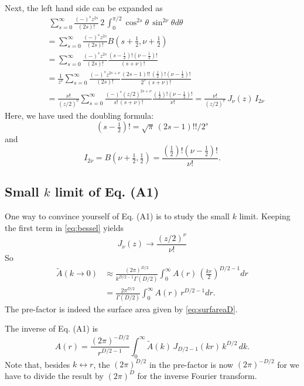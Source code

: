 \documentclass[preprint]{revtex4-1}
\numberwithin{equation}{subsection}
\numberwithin{table}{section}
\begin{document}
Next, the left hand side can be expanded as
%
\begin{align*}
& \;
  \sum_{s = 0}^\infty
  \frac{ (-)^s z^{2s} } { (2s)! }
  \,
  2 \, \int_0^{\pi/2} \cos^{2s} \theta \, \sin^{2\nu} \theta d \theta
  \\
&=
  \sum_{s = 0}^\infty
  \frac{ (-)^s z^{2s} } { (2s)! }
  B(s+\tfrac 1 2, \nu + \tfrac 1 2)
  \\
&=
  \sum_{s = 0}^\infty
  \frac{ (-)^s z^{2s} } { (2s)! }
  \frac{ (s-\tfrac 1 2)! (\nu - \tfrac 1 2)! }
       {  (s + \nu)!    }
  \\
&=
  \frac{1}{z^\nu}
  \sum_{s = 0}^\infty
  \frac{ (-)^s z^{2s + \nu} } { (2s)! }
  \frac{ (2s-1)!! \, (\tfrac 1 2)! (\nu - \tfrac 1 2)! }
      { 2^s \, (s + \nu)!    }
\\
&=
  \frac{\nu!}{(z/2)^\nu}
  \sum_{s = 0}^\infty
  \frac{ (-)^s (z/2)^{2s + \nu} } { s! \, (s + \nu)! }
  \frac{ (\tfrac 1 2)! (\nu - \tfrac 1 2)! }
       { \nu!    }
=
\frac{\nu!}{(z/2)^\nu} \, J_\nu(z) \, I_{2\nu}
\end{align*}
Here, we have used the doubling formula:
\begin{equation}
  (s - \tfrac 1 2)! = \sqrt\pi \, (2 s - 1)!! / 2^s
\end{equation}
and
\[
  I_{2\nu}
=
B(\nu + \tfrac{1}{2}, \tfrac{1}{2})
=
\frac{ (\tfrac 1 2)! (\nu - \tfrac 1 2)! }
       { \nu!    }.
\]



\subsection{Small $k$ limit of Eq. (A1)}



One way to convince yourself of Eq. (A1) is to study the small $k$ limit.
%
Keeping the first term in \eqref{eq:bessel} yields
\[
  J_\nu(z) \rightarrow \frac{ (z/2)^\nu }{ \nu! }
\]
So
%
\begin{align*}
\tilde A(k \rightarrow 0)
&\approx
\frac{ (2 \pi)^{D/2} } { k^{D/2 - 1} \Gamma(D/2) }
\int_0^\infty A(r) \, \left( \frac{k r}{2} \right)^{D/2 - 1} dr \\
&=
\frac{ 2 \pi^{D/2} } { \Gamma(D/2) }
\int_0^\infty A(r) \, r^{D/2 - 1} dr.
\end{align*}
%
The pre-factor is indeed the surface area
given by \eqref{eq:surfareaD}.


The inverse of Eq. (A1) is
\begin{equation}
A(r)
=
\frac{ (2\pi)^{-D/2} } { r^{D/2 - 1} }
\int_0^\infty \tilde{A}(k) \, J_{D/2-1}(kr) \, k^{D/2} \, dk.
\label{eq:invftsphr}
\end{equation}
Note that, besides $k \leftrightarrow r$,
the $(2\pi)^{D/2}$ in the pre-factor is now $(2\pi)^{-D/2}$
for we have to divide the result by $(2\pi)^D$
for the inverse Fourier transform.
\end{document}
